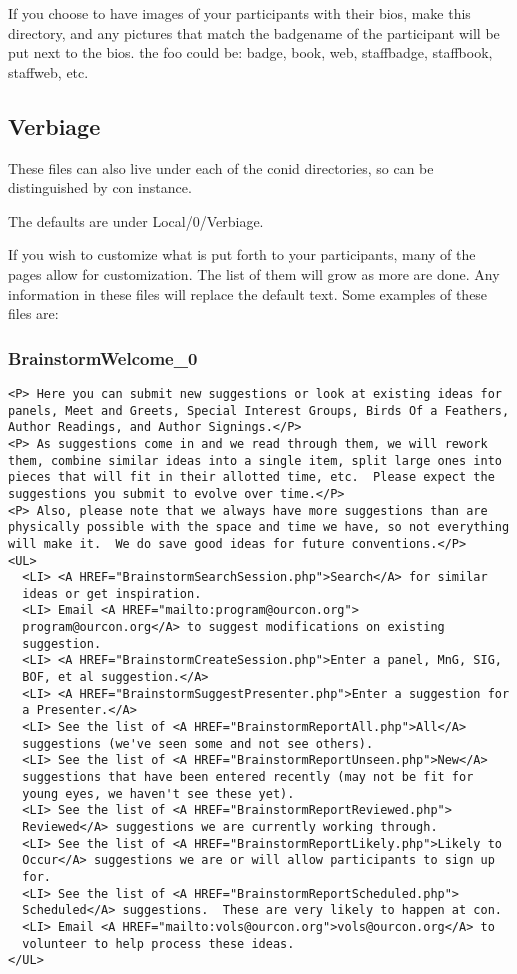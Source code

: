 \documentclass[captions=tablesignature]{scrartcl}
\begin{document}
If you choose to have images of your participants with their
bios, make this directory, and any pictures that match the
badgename of the participant will be put next to the bios.
the foo could be: badge, book, web, staffbadge, staffbook,
staffweb, etc.

\subsection{Verbiage}
\label{sec-3-7}

These files can also live under each of the conid directories, so
can be distinguished by con instance.

The defaults are under Local/0/Verbiage.

If you wish to customize what is put forth to your participants,
many of the pages allow for customization.  The list of them will
grow as more are done.  Any information in these files will
replace the default text.  Some examples of these files are:
\subsubsection{BrainstormWelcome\_0}
\label{sec-3-7-1}
\begin{verbatim}
<P> Here you can submit new suggestions or look at existing ideas for
panels, Meet and Greets, Special Interest Groups, Birds Of a Feathers,
Author Readings, and Author Signings.</P>
<P> As suggestions come in and we read through them, we will rework
them, combine similar ideas into a single item, split large ones into
pieces that will fit in their allotted time, etc.  Please expect the
suggestions you submit to evolve over time.</P>
<P> Also, please note that we always have more suggestions than are
physically possible with the space and time we have, so not everything
will make it.  We do save good ideas for future conventions.</P>
<UL>
  <LI> <A HREF="BrainstormSearchSession.php">Search</A> for similar
  ideas or get inspiration.
  <LI> Email <A HREF="mailto:program@ourcon.org">
  program@ourcon.org</A> to suggest modifications on existing
  suggestion.
  <LI> <A HREF="BrainstormCreateSession.php">Enter a panel, MnG, SIG,
  BOF, et al suggestion.</A>
  <LI> <A HREF="BrainstormSuggestPresenter.php">Enter a suggestion for
  a Presenter.</A>
  <LI> See the list of <A HREF="BrainstormReportAll.php">All</A>
  suggestions (we've seen some and not see others).
  <LI> See the list of <A HREF="BrainstormReportUnseen.php">New</A>
  suggestions that have been entered recently (may not be fit for
  young eyes, we haven't see these yet).
  <LI> See the list of <A HREF="BrainstormReportReviewed.php">
  Reviewed</A> suggestions we are currently working through.
  <LI> See the list of <A HREF="BrainstormReportLikely.php">Likely to
  Occur</A> suggestions we are or will allow participants to sign up
  for.
  <LI> See the list of <A HREF="BrainstormReportScheduled.php">
  Scheduled</A> suggestions.  These are very likely to happen at con.
  <LI> Email <A HREF="mailto:vols@ourcon.org">vols@ourcon.org</A> to
  volunteer to help process these ideas.
</UL>
\end{verbatim}
\end{document}
